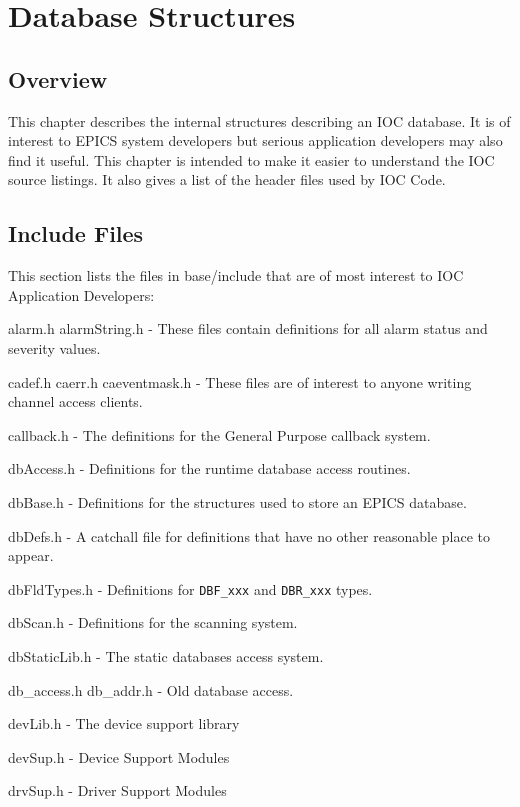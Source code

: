 \chapter{Database Structures}

\section{Overview}

This chapter describes the internal structures describing an IOC database. It is of interest to EPICS system developers but 
serious application developers may also find it useful. This chapter is intended to make it easier to understand the IOC 
source listings. It also gives a list of the header files used by IOC Code.

\section{Include Files}

This section lists the files in base/include that are of most interest to IOC Application Developers:

alarm.h alarmString.h - These files contain definitions for all alarm status and severity values.

cadef.h caerr.h caeventmask.h - These files are of interest to anyone writing channel access clients.

callback.h - The definitions for the General Purpose callback system.

dbAccess.h - Definitions for the runtime database access routines.

dbBase.h - Definitions for the structures used to store an EPICS database.

dbDefs.h - A catchall file for definitions that have no other reasonable place to appear.

dbFldTypes.h - Definitions for \verb|DBF_xxx| and \verb|DBR_xxx| types.

dbScan.h - Definitions for the scanning system.

dbStaticLib.h - The static databases access system.

db\_access.h db\_addr.h - Old database access.

devLib.h - The device support library

devSup.h - Device Support Modules

drvSup.h - Driver Support Modules

